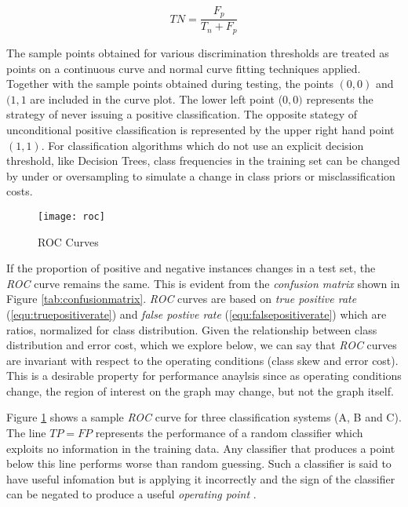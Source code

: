\documentclass[10pt]{unbthesis}
\begin{document}
\begin{equation}
\label{equ:falsepositiverate}
TN = \frac{F_p}{T_n + F_p}
\end{equation}

The sample points obtained for various
discrimination thresholds are treated as points on a continuous curve
and normal curve fitting techniques applied. Together with the sample
points obtained during testing, the points \((0,0)\) and \((1,1\) are
included in the curve plot. The lower left point (\(0,0)\) represents
the strategy of never issuing a positive classification. The opposite
stategy of unconditional positive classification is represented by the
upper right hand point \((1,1)\). For classification algorithms which
do not use an explicit decision threshold, like Decision Trees, class
frequencies in the training set can be changed by under or
oversampling to simulate a change in class priors or misclassification
costs. 

\begin{figure}
  \begin{center}
    \texttt{[image: roc]}
  \end{center}
  \caption{ROC Curves}
  \label{fig:roc}
\end{figure} 

If the proportion of positive and negative instances changes in a test
set, the \textit{ROC} curve remains the same. This is evident from the
\textit{confusion matrix} shown in Figure
\ref{tab:confusionmatrix}. \textit{ROC} curves are based on
\textit{true positive rate} (\ref{equ:truepositiverate}) and
\textit{false postive rate} (\ref{equ:falsepositiverate}) which are
ratios, normalized for class distribution. Given the relationship
between class distribution and error cost, which we explore below, we
can say that \textit{ROC} curves are invariant with respect to the
operating conditions (class skew and error cost). This is a desirable
property for performance anaylsis since as operating conditions
change, the region of interest on the graph may change, but not the
graph itself.

Figure \ref{fig:roc} shows a sample
\textit{ROC} curve for three classification systems (A, B and C). The
line \(TP=FP\) represents the performance of a random
classifier which exploits no information in the training data. Any
classifier that produces a point below this line performs worse than
random guessing. Such a classifier is said to have useful infomation
but is applying it incorrectly and the sign of the classifier can be
negated to produce a useful \textit{operating point} \cite{Refworks:60}.
\end{document}
